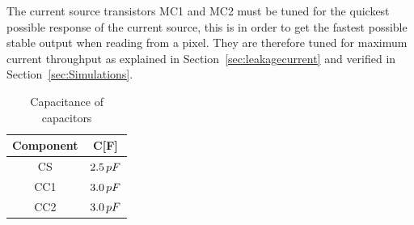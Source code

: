 The current source transistors MC1 and MC2 must be tuned for the quickest possible response of the current source, this is in order to get the fastest possible stable output when reading from a pixel.
They are therefore tuned for maximum current throughput as explained in Section~\ref{sec:leakagecurrent} and verified in Section~\ref{sec:Simulations}.

\begin{table}[htbp]
  \centering
  \caption{Capacitance of capacitors}
  \begin{tabular}{c | c}
    Component & C[F] \\
    \midrule
    CS & $2.5 \mskip3mu pF$ \\
    CC1 & $3.0 \mskip3mu pF$ \\
    CC2 & $3.0 \mskip3mu pF$
  \end{tabular} \label{tab:capcomponentvalues}
\end{table}
